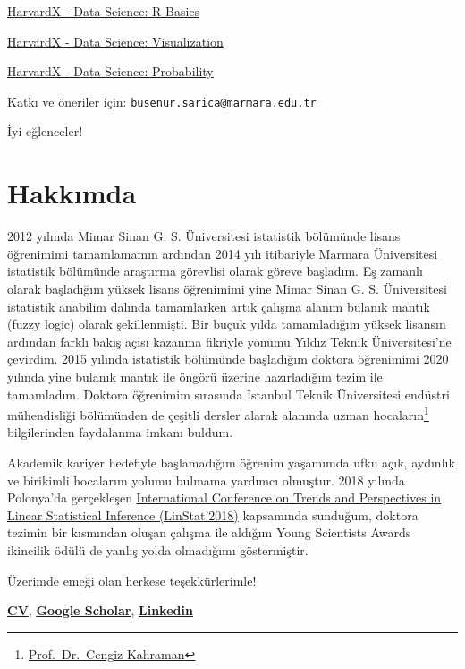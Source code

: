 \documentclass[
]{book}
\begin{document}
\href{https://www.edx.org/course/data-science-r-basics}{HarvardX - Data Science: R Basics}

\href{https://www.edx.org/course/data-science-visualization}{HarvardX - Data Science: Visualization}

\href{https://www.edx.org/course/data-science-probability}{HarvardX - Data Science: Probability}

Katkı ve öneriler için: \texttt{busenur.sarica@marmara.edu.tr}

İyi eğlenceler!

\hypertarget{hakkux131mda}{%
\section{Hakkımda}\label{hakkux131mda}}

2012 yılında Mimar Sinan G. S. Üniversitesi istatistik bölümünde lisans öğrenimimi tamamlamamın ardından 2014 yılı itibariyle Marmara Üniversitesi istatistik bölümünde araştırma görevlisi olarak göreve başladım. Eş zamanlı olarak başladığım yüksek lisans öğrenimimi yine Mimar Sinan G. S. Üniversitesi istatistik anabilim dalında tamamlarken artık çalışma alanım bulanık mantık (\href{https://en.wikipedia.org/wiki/Fuzzy_logic}{fuzzy logic}) olarak şekillenmişti. Bir buçuk yılda tamamladığım yüksek lisansın ardından farklı bakış açısı kazanma fikriyle yönümü Yıldız Teknik Üniversitesi'ne çevirdim. 2015 yılında istatistik bölümünde başladığım doktora öğrenimimi 2020 yılında yine bulanık mantık ile öngörü üzerine hazırladığım tezim ile tamamladım. Doktora öğrenimim sırasında İstanbul Teknik Üniversitesi endüstri mühendisliği bölümünden de çeşitli dersler alarak alanında uzman hocaların\footnote{\href{http://akademi.itu.edu.tr/kahramanc/}{Prof.~Dr.~Cengiz Kahraman}} bilgilerinden faydalanma imkanı buldum.

Akademik kariyer hedefiyle başlamadığım öğrenim yaşamımda ufku açık, aydınlık ve birikimli hocalarım yolumu bulmama yardımcı olmuştur. 2018 yılında Polonya'da gerçekleşen \href{http://www.linstat2018.put.poznan.pl/ysa.html}{International Conference on Trends and Perspectives in Linear Statistical Inference (LinStat'2018)} kapsamında sunduğum, doktora tezimin bir kısmından oluşan çalışma ile aldığım Young Scientists Awards ikincilik ödülü de yanlış yolda olmadığımı göstermiştir.

Üzerimde emeği olan herkese teşekkürlerimle!

\href{https://avesis.marmara.edu.tr/busenur.sarica}{\textbf{CV}}, \href{https://scholar.google.com.tr/citations?user=OKlYJEgAAAAJ\&hl=tr}{\textbf{Google Scholar}}, \href{https://www.linkedin.com/in/busenur-kızılaslan-795ab54a}{\textbf{Linkedin}}
\end{document}
